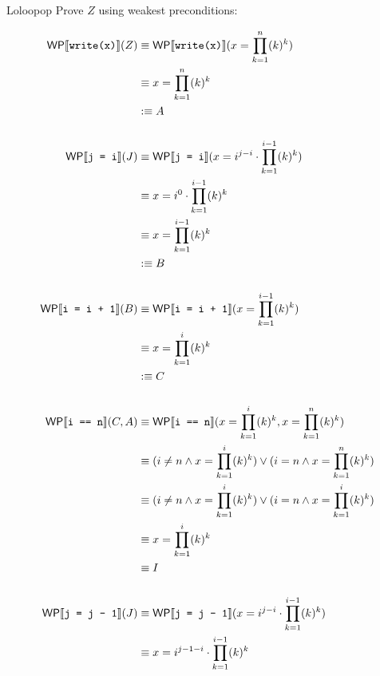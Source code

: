 \documentclass[
  english
]{tumteaching}
\begin{document}
\clearpage
\begin{assignment}[H,points=8]{Loloopop}
	Prove $Z$ using weakest preconditions:
	\begin{center}
		\begin{tikzpicture}
			
		\end{tikzpicture}
	\end{center}

	\noindent {}
	
	\begin{align*}
		\WP{write(x)}(Z)
		&\equiv \WP{write(x)}(x = \prod \limits_{k=1}^{n}(k)^k) \\
		&\equiv x = \prod \limits_{k=1}^{n}(k)^k \\
		&\defequiv A \\
		\\
		\WP{j = i}(J)
		&\equiv \WP{j = i}(x = i^{j - i} \cdot \prod \limits_{k=1}^{i-1}(k)^k) \\
		&\equiv x = i^{0} \cdot \prod \limits_{k=1}^{i-1}(k)^k \\
		&\equiv x = \prod \limits_{k=1}^{i-1}(k)^k \\
		&\defequiv B \\
		\\
		\WP{i = i + 1}(B)
		&\equiv \WP{i = i + 1}(x = \prod \limits_{k=1}^{i-1}(k)^k) \\
		&\equiv x = \prod \limits_{k=1}^{i}(k)^k \\
		&\defequiv C \\
		\\
		\WP{i == n}(C, A)
		&\equiv \WP{i == n}(x = \prod \limits_{k=1}^{i}(k)^k, x = \prod \limits_{k=1}^{n}(k)^k) \\
		&\equiv (i \neq n \land x = \prod \limits_{k=1}^{i}(k)^k) \lor (i = n \land x = \prod \limits_{k=1}^{n}(k)^k) \\
		&\equiv (i \neq n \land x = \prod \limits_{k=1}^{i}(k)^k) \lor (i = n \land x = \prod \limits_{k=1}^{i}(k)^k) \\
		&\equiv x = \prod \limits_{k=1}^{i}(k)^k \\
		&\equiv I \\
		\\
		\WP{j = j - 1}(J)
		&\equiv \WP{j = j - 1}(x = i^{j - i} \cdot \prod \limits_{k=1}^{i-1}(k)^k) \\
		&\equiv x = i^{j - 1 - i} \cdot \prod \limits_{k=1}^{i-1}(k)^k \\

\end{align*}
\end{assignment}
\end{document}
